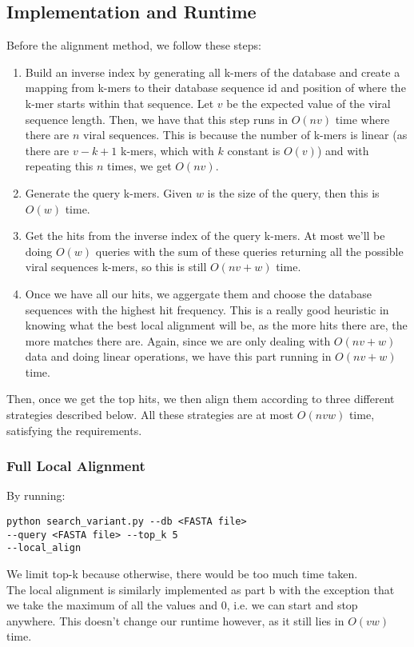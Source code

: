 \documentclass[10pt]{article}
\begin{document}
\subsection*{Implementation and Runtime}
Before the alignment method, we follow these steps:
\begin{enumerate}
    \item Build an inverse index by generating all k-mers of the database and create a mapping from k-mers to their database sequence id and position of where the k-mer starts within that sequence. Let $v$ be the expected value of the viral sequence length. Then, we have that this step runs in $O(nv)$ time where there are $n$ viral sequences. This is because the number of k-mers is linear (as there are $v - k + 1$ k-mers, which with $k$ constant is $O(v)$) and with repeating this $n$ times, we get $O(nv)$.
    \item Generate the query k-mers. Given $w$ is the size of the query, then this is $O(w)$ time.
    \item Get the hits from the inverse index of the query k-mers. At most we'll be doing $O(w)$ queries with the sum of these queries returning all the possible viral sequences k-mers, so this is still $O(nv + w)$ time.
    \item Once we have all our hits, we aggergate them and choose the database sequences with the highest hit frequency. This is a really good heuristic in knowing what the best local alignment will be, as the more hits there are, the more matches there are. Again, since we are only dealing with $O(nv + w)$ data and doing linear operations, we have this part running in $O(nv + w)$ time.
\end{enumerate}

Then, once we get the top hits, we then align them according to three different strategies described below. All these strategies are at most $O(nvw)$ time, satisfying the requirements.

\subsubsection*{Full Local Alignment}
By running:
\begin{lstlisting}
python search_variant.py --db <FASTA file> 
--query <FASTA file> --top_k 5
--local_align
\end{lstlisting}
We limit top-k because otherwise, there would be too much time taken.\\

The local alignment is similarly implemented as part b with the exception that we take the maximum of all the values and 0, i.e. we can start and stop anywhere. This doesn't change our runtime however, as it still lies in $O(vw)$ time.\\
\end{document}
